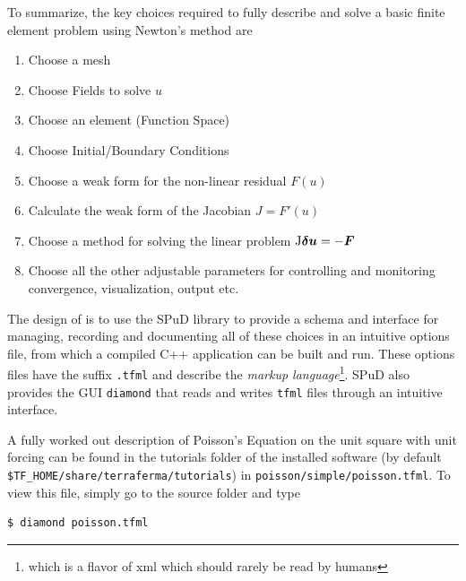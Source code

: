 To summarize,  the key choices required to fully describe and solve a
basic finite element problem using Newton's method are
\begin{enumerate}
\setlength{\itemsep}{0cm}
\item Choose a mesh
\item Choose Fields to solve $u$
\item Choose an element (Function Space)
\item Choose Initial/Boundary Conditions
\item Choose a weak form for the non-linear residual $F(u)$
\item Calculate the weak form of the Jacobian $J=F'(u)$
\item Choose a method for solving the linear problem $\mathrm{J}{\mbox{\boldmath$\delta u$}} = -{\mbox{\boldmath$F$}}$
\item Choose all the other adjustable parameters for controlling and
  monitoring convergence, visualization, output etc.
\end{enumerate}

The design of \TF{} is to use the SPuD library to provide a schema and interface
for managing, recording and documenting all of these choices in an
intuitive options file, from which a compiled C++ application can
be built and run.  These options files have the suffix \texttt{.tfml}
and describe the \emph{\TF{} markup language}\footnote{which is a
  flavor of  xml which should rarely  be read by humans}.  SPuD also provides the GUI
\texttt{diamond} that reads and writes \texttt{tfml} files through an
intuitive interface.  

A fully worked out description of Poisson's Equation on the unit
square with unit forcing can be found in the tutorials folder of the
installed software (by default
\texttt{\${TF\_HOME}/share/terraferma/tutorials}) in
\texttt{poisson/simple/poisson.tfml}.  To view this file, simply go to
the source folder and type
\begin{lstlisting}[style=Bash]
$ diamond poisson.tfml
\end{lstlisting}

